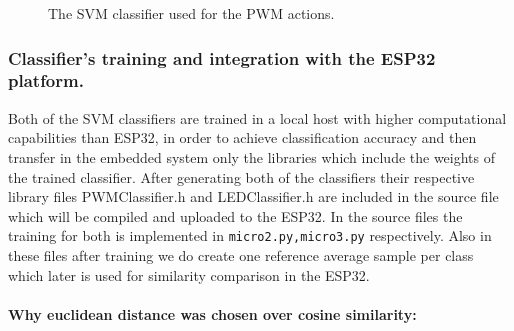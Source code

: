 \documentclass[a4paper,12pt]{article}
\begin{document}
\begin{figure}[h!]
\centering
{}
\caption{The SVM classifier used for the PWM actions.}
\end{figure}



	\subsubsection{Classifier's training and integration with the ESP32 platform.}
	Both of the SVM classifiers are trained in a local host with higher computational capabilities than ESP32, 
	in order to achieve classification accuracy and then transfer in the embedded system only the libraries 
	which include the weights of the trained classifier.  After generating both of the classifiers their respective library 
	files PWMClassifier.h and LEDClassifier.h are included in the source file which will be compiled and uploaded to the ESP32.
	In the source files the training for both is implemented in \texttt{micro2.py,micro3.py} respectively. Also in these files
	after training we do create one reference average sample per class which later is used for similarity comparison in the ESP32.


	\paragraph{Why euclidean distance was chosen over cosine similarity:}
\end{document}
